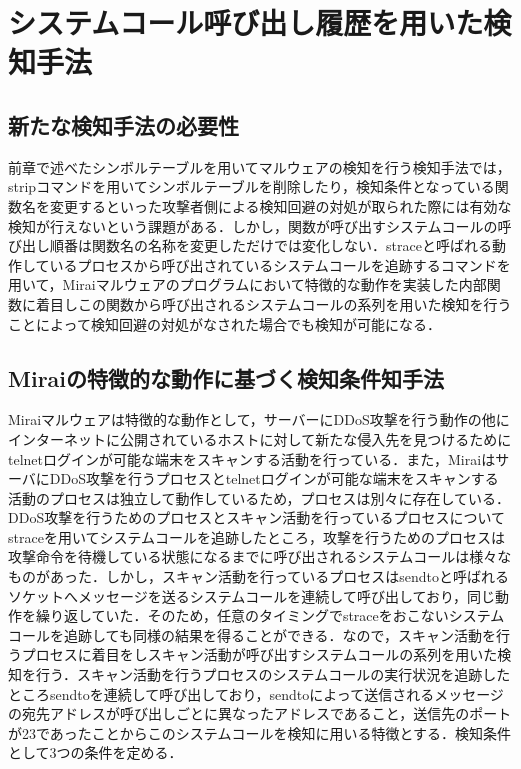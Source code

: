 \chapter{システムコール呼び出し履歴を用いた検知手法}

\section{新たな検知手法の必要性}
前章で述べたシンボルテーブルを用いてマルウェアの検知を行う検知手法では，stripコマンドを用いてシンボルテーブルを削除したり，検知条件となっている関数名を変更するといった攻撃者側による検知回避の対処が取られた際には有効な検知が行えないという課題がある．しかし，関数が呼び出すシステムコールの呼び出し順番は関数名の名称を変更しただけでは変化しない．straceと呼ばれる動作しているプロセスから呼び出されているシステムコールを追跡するコマンドを用いて，Miraiマルウェアのプログラムにおいて特徴的な動作を実装した内部関数に着目しこの関数から呼び出されるシステムコールの系列を用いた検知を行うことによって検知回避の対処がなされた場合でも検知が可能になる．

\section{Miraiの特徴的な動作に基づく検知条件知手法}
Miraiマルウェアは特徴的な動作として，サーバーにDDoS攻撃を行う動作の他にインターネットに公開されているホストに対して新たな侵入先を見つけるためにtelnetログインが可能な端末をスキャンする活動を行っている．また，MiraiはサーバにDDoS攻撃を行うプロセスとtelnetログインが可能な端末をスキャンする活動のプロセスは独立して動作しているため，プロセスは別々に存在している．DDoS攻撃を行うためのプロセスとスキャン活動を行っているプロセスについてstraceを用いてシステムコールを追跡したところ，攻撃を行うためのプロセスは攻撃命令を待機している状態になるまでに呼び出されるシステムコールは様々なものがあった．しかし，スキャン活動を行っているプロセスはsendtoと呼ばれるソケットへメッセージを送るシステムコールを連続して呼び出しており，同じ動作を繰り返していた．そのため，任意のタイミングでstraceをおこないシステムコールを追跡しても同様の結果を得ることができる．なので，スキャン活動を行うプロセスに着目をしスキャン活動が呼び出すシステムコールの系列を用いた検知を行う．スキャン活動を行うプロセスのシステムコールの実行状況を追跡したところsendtoを連続して呼び出しており，sendtoによって送信されるメッセージの宛先アドレスが呼び出しごとに異なったアドレスであること，送信先のポートが23であったことからこのシステムコールを検知に用いる特徴とする．検知条件として3つの条件を定める．

